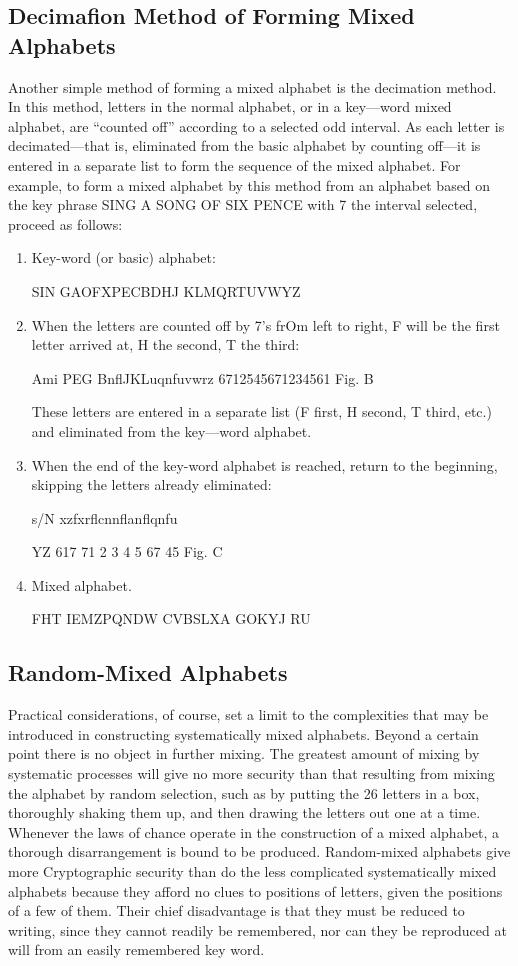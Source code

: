 \subsection{Decimaﬁon Method of Forming Mixed Alphabets}

Another simple method of forming a mixed alphabet is the decimation
method. In this method, letters in the normal alphabet, or in a key—word
mixed alphabet, are “counted off” according to a selected odd interval.
As each letter is decimated—that is, eliminated from the basic alphabet
by counting off—it is entered in a separate list to form the sequence of
the mixed alphabet. For example, to form a mixed alphabet by this
method from an alphabet based on the key phrase SING A SONG OF
SIX PENCE with 7 the interval selected, proceed as follows:

\begin{enumerate}[label=\alph*]
\item Key-word (or basic) alphabet:

SIN GAOFXPECBDHJ KLMQRTUVWYZ

\item When the letters are counted off by 7’s frOm left to right, F will
be the ﬁrst letter arrived at, H the second, T the third:

Ami PEG BnﬂJKLuqnfuvwrz
6712545671234561
Fig. B

These letters are entered in a separate list (F ﬁrst, H second, T third,
etc.) and eliminated from the key—word alphabet.

\item When the end of the key-word alphabet is reached, return to the
beginning, skipping the letters already eliminated:

s/N xzfxrﬂcnnﬂanﬂqnfu

YZ
617 71 2 3 4 5 67 45
Fig. C
\item Mixed alphabet.

FHT IEMZPQNDW CVBSLXA GOKYJ RU
\end{enumerate}

\subsection{Random-Mixed Alphabets}

Practical considerations, of course, set a limit to the complexities that
may be introduced in constructing systematically mixed alphabets.
Beyond a certain point there is no object in further mixing. The greatest
amount of mixing by systematic processes will give no more security
than that resulting from mixing the alphabet by random selection, such
as by putting the 26 letters in a box, thoroughly shaking them up, and
then drawing the letters out one at a time. Whenever the laws of chance
operate in the construction of a mixed alphabet, a thorough disarrangement is bound to be produced. Random-mixed alphabets give more
Cryptographic security than do the less complicated systematically mixed
alphabets because they afford no clues to positions of letters, given the
positions of a few of them. Their chief disadvantage is that they must be
reduced to writing, since they cannot readily be remembered, nor can
they be reproduced at will from an easily remembered key word.


